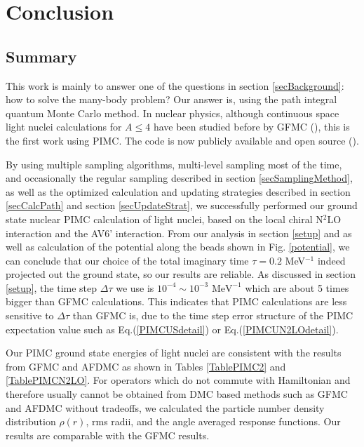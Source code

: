 \documentclass[12pt,letterpaper,UTF8]{report}
\begin{document}
\chapter{Conclusion}
\label{secSumOutlook}

\section{Summary}
\label{summary}

This work is mainly to answer one of the questions in section \ref{secBackground}: how to solve the many-body problem?
Our answer is, using the path integral quantum Monte Carlo method.
In nuclear physics, although continuous space light nuclei calculations for $A\leq 4$ have been studied before by GFMC (\cite{Carlson88a,WiringaPieper02a}), this is the first work using PIMC. The code is now publicly available and open source (\cite{CRgitrepov6pimc1}).

By using multiple sampling algorithms, multi-level sampling most of the time,  and occasionally the regular sampling described in section \ref{secSamplingMethod},
as well as the optimized calculation and updating strategies described in section \ref{secCalcPath} and section \ref{secUpdateStrat}, we successfully performed our ground state nuclear PIMC calculation of light nuclei, based on the local chiral N$^2$LO interaction and the AV6' interaction.
From our analysis in section \ref{setup} and as well as calculation of the potential along the beads shown in Fig. \ref{potential}, we can conclude that our choice of the total imaginary time $\tau=0.2$ MeV$^{-1}$ indeed projected out the ground state, so our results are reliable.
As discussed in section \ref{setup}, the time step $\Delta \tau$ we use is $10^{-4} \sim 10^{-3} \textrm{ MeV}^{-1}$ which are about 5 times bigger than GFMC calculations. This indicates that PIMC calculations are less sensitive to $\Delta \tau$ than GFMC is, due to the time step error structure of the PIMC expectation value such as Eq.(\ref{PIMCUSdetail}) or Eq.(\ref{PIMCUN2LOdetail}).

Our PIMC ground state energies of light nuclei are consistent with the results from GFMC and AFDMC as shown in Tables \ref{TablePIMC2} and \ref{TablePIMCN2LO}.
For operators which do not commute with Hamiltonian and therefore usually cannot be obtained from DMC based methods such as GFMC and AFDMC without tradeoffs, we calculated the particle number density distribution $\rho(r)$, rms radii, and the angle averaged response functions.
Our results are comparable with the GFMC results.
\end{document}
